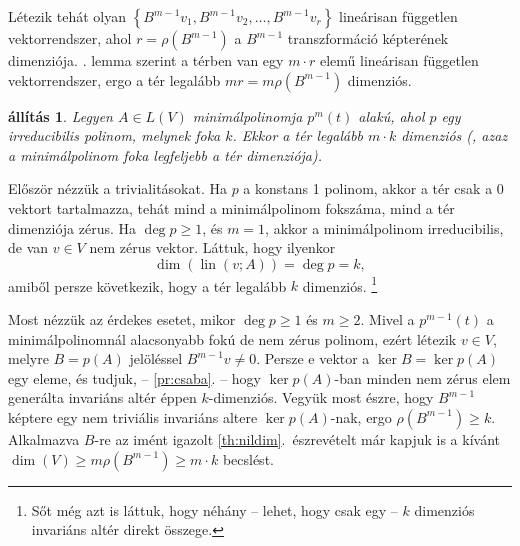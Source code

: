 \documentclass[a4paper, showtrims]{memoir}
\makeatletter
\renewenvironment{proof}[1][\proofname]
    {\par\pushQED{\qed}%
    \normalfont \topsep6\p@\@plus6\p@\relax
    \trivlist
    \item[\hskip\labelsep
        \itshape
    #1\@addpunct{:}]\ignorespaces}
    {\popQED\endtrivlist\@endpefalse}
\theoremstyle{plain}
\newtheorem{proposition}{állítás}[chapter]
\theoremstyle{remark}
\theoremstyle{definition}
\DeclareMathOperator{\lin}{lin}
\DeclareMathOperator{\im}{Im}
\makeatother
\begin{document}
\begin{proof}
	Létezik tehát olyan $\left\{ B^{m-1}v_1,B^{m-1}v_2,\ldots,B^{m-1}v_r \right\}$
	lineárisan független vektorrendszer, ahol $r=\rho(B^{m-1})$ a $B^{m-1}$ transzformáció képterének dimenziója.
    . lemma szerint a térben van egy $m\cdot r$ elemű lineárisan független vektorrendszer,
	ergo a tér legalább $mr=m\rho\left( B^{m-1} \right)$ dimenziós.
\end{proof}
\begin{proposition}
	Legyen $A\in L\left( V \right)$ minimálpolinomja
	$
		p^{m}\left( t \right)
	$
	alakú,
	ahol $p$ egy irreducibilis polinom, melynek foka $k$.
	Ekkor a tér legalább $m\cdot k$ dimenziós
	(, azaz a minimálpolinom foka legfeljebb a tér dimenziója).
	\label{th:minpol1}
\end{proposition}
\begin{proof}
	Először nézzük a trivialitásokat.
	Ha $p$ a konstans 1 polinom, akkor a tér csak a 0 vektort tartalmazza,
	tehát mind a minimálpolinom fokszáma, mind a tér dimenziója zérus.
	Ha $\deg p\geq 1$, és $m=1$, akkor a minimálpolinom irreducibilis,
	de van $v\in V$ nem zérus vektor.
	Láttuk, hogy ilyenkor
	\[
		\dim\left( \lin\left( v;A \right) \right)=\deg p=k,
	\]
	amiből persze következik, hogy a tér legalább $k$ dimenziós.
	\footnote{Sőt még azt is láttuk, hogy néhány -- lehet, hogy csak egy -- $k$ dimenziós invariáns altér direkt összege.}

	Most nézzük az érdekes esetet,
	mikor $\deg p\geq 1$ és $m\geq 2$.
	Mivel a
	\begin{math}
		p^{m-1}\left( t \right)
	\end{math}
	a minimálpolinomnál alacsonyabb fokú de nem zérus polinom,
	ezért létezik $v\in V$, melyre $B=p\left( A \right)$ jelöléssel
	\(
	B^{m-1}v\neq 0.
	\)
	Persze e vektor a $\ker B=\ker p\left( A \right)$
	egy eleme,
    és tudjuk, -- \ref{pr:csaba}. --
    hogy $\ker p\left( A \right)$-ban minden nem zérus elem generálta invariáns altér éppen $k$-dimenziós.
    Vegyük most észre, hogy 
    \( B^{m-1}\)
    képtere egy nem triviális invariáns altere 
    \(\ker p\left( A \right)\)-nak,
    ergo 
    \( \rho\left( B^{m-1} \right)
    \geq
    k.\)
	Alkalmazva $B$-re az imént igazolt \ref{th:nildim}.~észrevételt már kapjuk is a kívánt
	\(
	\dim(V)\geq m\rho\left( B^{m-1} \right)\geq m\cdot k
	\)
	becslést.
\end{proof}
\end{document}

